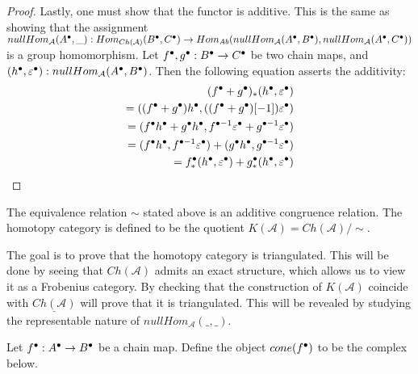 \begin{proof}
        Lastly, one must show that the functor is additive. This is the same as showing that the assignment $nullHom_{\mathcal{A}}(A^{\bullet},\_):Hom_{Ch(\mathcal{A})}(B^{\bullet},C^{\bullet})\rightarrow Hom_{Ab}(nullHom_{\mathcal{A}}(A^{\bullet},B^{\bullet}),nullHom_{\mathcal{A}}(A^{\bullet},C^{\bullet}))$ is a group homomorphism. Let $f^{\bullet},g^{\bullet}:B^{\bullet}\rightarrow C^{\bullet}$ be two chain maps, and $(h^{\bullet},\varepsilon^{\bullet}):nullHom_{\mathcal{A}}(A^{\bullet},B^{\bullet})$. Then the following equation asserts the additivity:
        \begin{align*}
            (f^{\bullet}+g^{\bullet})_*(h^{\bullet},\varepsilon^{\bullet})\\
            =((f^{\bullet}+g^{\bullet})h^{\bullet},((f^{\bullet}+g^{\bullet})[-1])\varepsilon^{\bullet})\\
            =(f^{\bullet}h^{\bullet}+g^{\bullet}h^{\bullet},f^{\bullet-1}\varepsilon^{\bullet}+g^{\bullet-1}\varepsilon^{\bullet})\\
            =(f^{\bullet}h^{\bullet},f^{\bullet-1}\varepsilon^{\bullet})+(g^{\bullet}h^{\bullet},g^{\bullet-1}\varepsilon^{\bullet})\\
            =f^{\bullet}_*(h^{\bullet},\varepsilon^{\bullet})+g^{\bullet}_*(h^{\bullet},\varepsilon^{\bullet})
        \end{align*}
    \end{proof}

    \begin{corollary}
        The equivalence relation $\sim$ stated above is an additive congruence relation. The homotopy category is defined to be the quotient $K(\mathcal{A}) = Ch(\mathcal{A})/\sim$.
    \end{corollary}

    The goal is to prove that the homotopy category is triangulated. This will be done by seeing that $Ch(\mathcal{A})$ admits an exact structure, which allows us to view it as a Frobenius category. By checking that the construction of $K(\mathcal{A})$ coincide with $\underline{Ch(\mathcal{A})}$ will prove that it is triangulated. This will be revealed by studying the representable nature of $nullHom_{\mathcal{A}}(\_,\_)$.

    \begin{definition}
        Let $f^{\bullet}:A^{\bullet}\rightarrow B^{\bullet}$ be a chain map. Define the object $cone(f^{\bullet})$ to be the complex below.
        \begin{center}
        \end{center}
    \end{definition}

